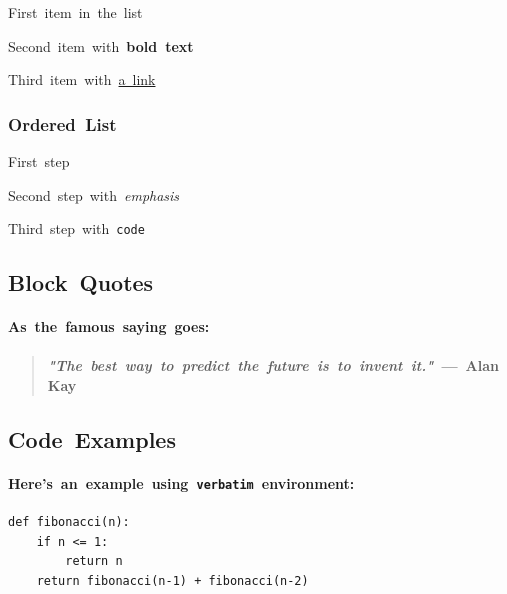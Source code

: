 \documentclass{article}
\begin{document}
{\begin{itemize}
{\relax\relax \item First~item~in~the~list\relax\relax \item {\relax\relax Second~item~with~\relax\relax \textbf{bold~text}\relax }\relax\relax \item {\relax\relax Third~item~with~\relax\relax \href{https://example.com}{a~link}\relax }}
\end{itemize}\relax\relax \subsubsection{Ordered~List}\relax \relax\relax \begin{enumerate}
{\relax\relax \item First~step\relax\relax \item {\relax\relax Second~step~with~\relax\relax \textit{emphasis}\relax }\relax\relax \item {\relax\relax Third~step~with~\relax\relax \texttt{code}\relax }}
\end{enumerate}\relax\relax \subsection{Block~Quotes}\relax \relax\relax \paragraph{As~the~famous~saying~goes:}\relax \relax\relax \begin{quote}
{\relax\relax \paragraph{{\relax\relax \textit{"The~best~way~to~predict~the~future~is~to~invent~it."}\relax \relax\relax ~—~Alan~Kay}}\relax }
\end{quote}\relax\relax \subsection{Code~Examples}\relax \relax\relax \paragraph{{\relax\relax Here's~an~example~using~\relax\relax \texttt{verbatim}\relax \relax\relax ~environment:}}\relax \relax\relax \begin{verbatim}
def fibonacci(n):
    if n <= 1:
        return n
    return fibonacci(n-1) + fibonacci(n-2)


\end{verbatim}}
\end{document}
